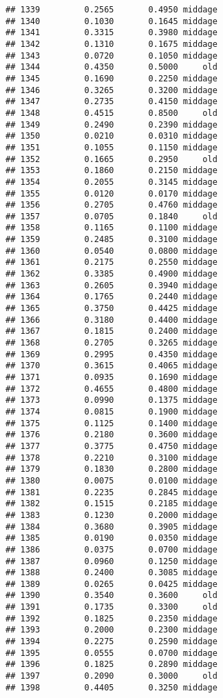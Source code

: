 \documentclass[
]{article}
\begin{document}
\begin{verbatim}
## 1339         0.2565       0.4950 middage
## 1340         0.1030       0.1645 middage
## 1341         0.3315       0.3980 middage
## 1342         0.1310       0.1675 middage
## 1343         0.0720       0.1050 middage
## 1344         0.4350       0.5000     old
## 1345         0.1690       0.2250 middage
## 1346         0.3265       0.3200 middage
## 1347         0.2735       0.4150 middage
## 1348         0.4515       0.8500     old
## 1349         0.2490       0.2390 middage
## 1350         0.0210       0.0310 middage
## 1351         0.1055       0.1150 middage
## 1352         0.1665       0.2950     old
## 1353         0.1860       0.2150 middage
## 1354         0.2055       0.3145 middage
## 1355         0.0120       0.0170 middage
## 1356         0.2705       0.4760 middage
## 1357         0.0705       0.1840     old
## 1358         0.1165       0.1100 middage
## 1359         0.2485       0.3100 middage
## 1360         0.0540       0.0800 middage
## 1361         0.2175       0.2550 middage
## 1362         0.3385       0.4900 middage
## 1363         0.2605       0.3940 middage
## 1364         0.1765       0.2440 middage
## 1365         0.3750       0.4425 middage
## 1366         0.3180       0.4400 middage
## 1367         0.1815       0.2400 middage
## 1368         0.2705       0.3265 middage
## 1369         0.2995       0.4350 middage
## 1370         0.3615       0.4065 middage
## 1371         0.0935       0.1690 middage
## 1372         0.4655       0.4800 middage
## 1373         0.0990       0.1375 middage
## 1374         0.0815       0.1900 middage
## 1375         0.1125       0.1400 middage
## 1376         0.2180       0.3600 middage
## 1377         0.3775       0.4750 middage
## 1378         0.2210       0.3100 middage
## 1379         0.1830       0.2800 middage
## 1380         0.0075       0.0100 middage
## 1381         0.2235       0.2845 middage
## 1382         0.1515       0.2185 middage
## 1383         0.1230       0.2000 middage
## 1384         0.3680       0.3905 middage
## 1385         0.0190       0.0350 middage
## 1386         0.0375       0.0700 middage
## 1387         0.0960       0.1250 middage
## 1388         0.2400       0.3085 middage
## 1389         0.0265       0.0425 middage
## 1390         0.3540       0.3600     old
## 1391         0.1735       0.3300     old
## 1392         0.1825       0.2350 middage
## 1393         0.2000       0.2300 middage
## 1394         0.2275       0.2590 middage
## 1395         0.0555       0.0700 middage
## 1396         0.1825       0.2890 middage
## 1397         0.2090       0.3000     old
## 1398         0.4405       0.3250 middage

\end{verbatim}
\end{document}
